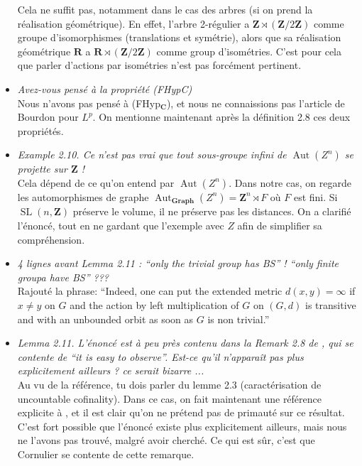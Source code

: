 \documentclass[a4paper]{article}
\theoremstyle{definition}
\DeclareMathOperator\SL{SL}
\DeclareMathOperator\Aut{Aut}
\newcommand*{\field}[1]{\mathbf{#1}}
\newcommand*{\Z}{\field{Z}}
\begin{document}
\begin{itemize}
Cela ne suffit pas, notamment dans le cas des arbres (si on prend la réalisation géométrique). En effet, l'arbre 2-régulier a $\mathbf Z\rtimes(\Z/2\Z)$ comme groupe d'isomorphismes (translations et symétrie), alors que sa réalisation géométrique $\mathbf R$ a $\mathbf R\rtimes(\Z/2\Z)$ comme group d'isométries. C'est pour cela que parler d'actions par isométries n'est pas forcément pertinent.
\item\textit{Avez-vous pensé à la propriété (FHypC)}\\
Nous n'avons pas pensé à (FHyp$_{\mathbf{C}}$), et nous ne connaissions pas l'article de Bourdon pour $L^p$. On mentionne maintenant après la définition 2.8 ces deux propriétés.
\item
\textit{Example 2.10. Ce n’est pas vrai que tout sous-groupe infini de $\Aut(Z^n)$ se projette sur $\Z$ !}\\
Cela dépend de ce qu'on entend par $\Aut(Z^n)$. Dans notre cas, on regarde les automorphismes de graphe $\Aut_{\mathbf{Graph}}(Z^n)=\Z^n\rtimes F$ où $F$ est fini. Si $\SL(n,\Z)$ préserve le volume, il ne préserve pas les distances. On a clarifié l'énoncé, tout en ne gardant que l'exemple avec $Z$ afin de simplifier sa compréhension.
\item
\textit{4 lignes avant Lemma 2.11 : “only the trivial group has BS” ! “only finite
groupa have BS” ???}\\
Rajouté la phrase: ``Indeed, one can put the extended metric $d(x,y)=\infty$ if $x\neq y$ on $G$ and the action by left multiplication of $G$ on $(G,d)$ is transitive and with an unbounded orbit as soon as $G$ is non trivial.''
\item
\textit{Lemma 2.11. L’énoncé est à peu près contenu dans la Remark 2.8 de \cite{MR2240370}, qui se contente de “it is easy to observe”. Est-ce qu’il n’apparaît pas plus explicitement ailleurs ? ce serait bizarre ...}\\
Au vu de la référence, tu dois parler du lemme 2.3 (caractérisation de uncountable cofinality).
Dans ce cas, on fait maintenant une référence explicite à \cite{MR2240370}, et il est clair qu'on ne prétend pas de primauté sur ce résultat. C'est fort possible que l'énoncé existe plus explicitement ailleurs, mais nous ne l'avons pas trouvé, malgré avoir cherché. Ce qui est sûr, c'est que Cornulier se contente de cette remarque.

\end{itemize}
\end{document}
